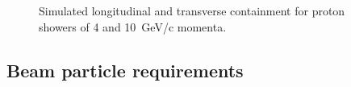 \begin{figure}[htp]
\begin{tabular}{ccc}
% 
 
  \end{tabular}
  \caption{Simulated longitudinal and transverse containment for proton showers of 4 and 10~GeV/c momenta.
}
  \label{fig:containment}  
\end{figure}

\subsection {Beam particle requirements}

